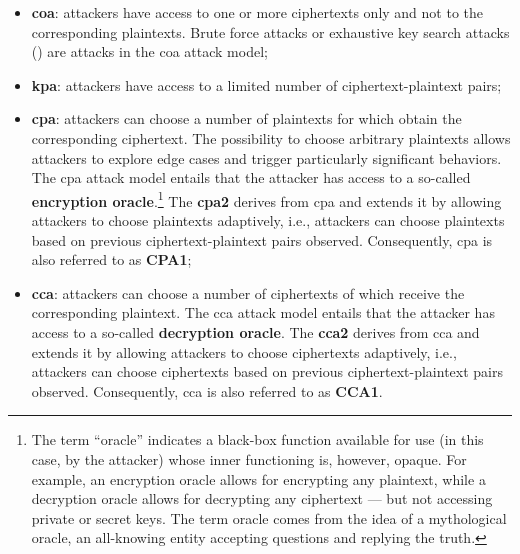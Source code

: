 \begin{itemize}
	\item \textbf{\gls{coa}}: attackers have access to one or more ciphertexts only and not to the corresponding plaintexts. Brute force attacks or exhaustive key search attacks () are attacks in the \gls{coa} attack model;
	\item \textbf{\gls{kpa}}: attackers have access to a limited number of ciphertext-plaintext pairs;
	\item \textbf{\gls{cpa}}: attackers can choose a number of plaintexts for which obtain the corresponding ciphertext. The possibility to choose arbitrary plaintexts allows attackers to explore edge cases and trigger particularly significant behaviors. The \gls{cpa} attack model entails that the attacker has access to a so-called \textbf{encryption oracle}.\footnote{The term ``oracle'' indicates a black-box function available for use (in this case, by the attacker) whose inner functioning is, however, opaque. For example, an encryption oracle allows for encrypting any plaintext, while a decryption oracle allows for decrypting any ciphertext --- but not accessing private or secret keys. The term oracle comes from the idea of a mythological oracle, an all-knowing entity accepting questions and replying the truth.} The \textbf{\gls{cpa2}} derives from \gls{cpa} and extends it by allowing attackers to choose plaintexts adaptively, i.e., attackers can choose plaintexts based on previous ciphertext-plaintext pairs observed. Consequently, \gls{cpa} is also referred to as \textbf{CPA1};
	\item \textbf{\gls{cca}}: attackers can choose a number of ciphertexts of which receive the corresponding plaintext. The \gls{cca} attack model entails that the attacker has access to a so-called \textbf{decryption oracle}. The \textbf{\gls{cca2}} derives from \gls{cca} and extends it by allowing attackers to choose ciphertexts adaptively, i.e., attackers can choose ciphertexts based on previous ciphertext-plaintext pairs observed. Consequently, \gls{cca} is also referred to as \textbf{CCA1}.
\end{itemize}

